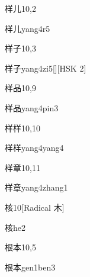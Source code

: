 \begin{entry}{样儿}{10,2}
  \begin{phonetics}{样儿}{yang4r5}
  \end{phonetics}
\end{entry}

\begin{entry}{样子}{10,3}
  \begin{phonetics}{样子}{yang4zi5}[][HSK 2]
  \end{phonetics}
\end{entry}

\begin{entry}{样品}{10,9}
  \begin{phonetics}{样品}{yang4pin3}
  \end{phonetics}
\end{entry}

\begin{entry}{样样}{10,10}
  \begin{phonetics}{样样}{yang4yang4}
  \end{phonetics}
\end{entry}

\begin{entry}{样章}{10,11}
  \begin{phonetics}{样章}{yang4zhang1}
  \end{phonetics}
\end{entry}

\begin{entry}{核}{10}[Radical 木]
  \begin{phonetics}{核}{he2}
  \end{phonetics}
\end{entry}

\begin{entry}{根本}{10,5}
  \begin{phonetics}{根本}{gen1ben3}
  \end{phonetics}
\end{entry}

